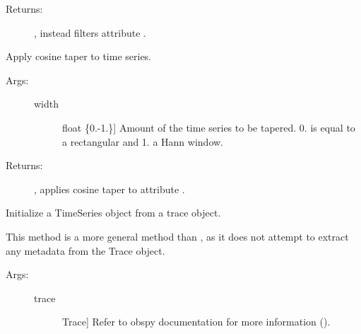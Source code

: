\documentclass[letterpaper,10pt,english]{sphinxmanual}
\begin{document}
\begin{fulllineitems}
\begin{fulllineitems}
\begin{description}
\item[{Returns:}] \leavevmode
{}, instead filters attribute .

\end{description}

\end{fulllineitems}


\begin{fulllineitems}
\label{\detokenize{index:sigpropy.TimeSeries.cosine_taper}}
Apply cosine taper to time series.
\begin{description}
\item[{Args:}] \leavevmode\begin{description}
\item[{width}] \leavevmode{[}float \{0.-1.\}{]}
Amount of the time series to be tapered.
0. is equal to a rectangular and 1. a Hann window.

\end{description}

\item[{Returns:}] \leavevmode
{}, applies cosine taper to attribute .

\end{description}

\end{fulllineitems}


\begin{fulllineitems}
\label{\detokenize{index:sigpropy.TimeSeries.from_trace}}
Initialize a TimeSeries object from a trace object.

This method is a more general method than , 
as it does not attempt to extract any metadata from the Trace 
object.
\begin{description}
\item[{Args:}] \leavevmode\begin{description}
\item[{trace}] \leavevmode{[}Trace{]}
Refer to obspy documentation for more information
().


\end{description}
\end{description}
\end{fulllineitems}
\end{fulllineitems}
\end{document}
